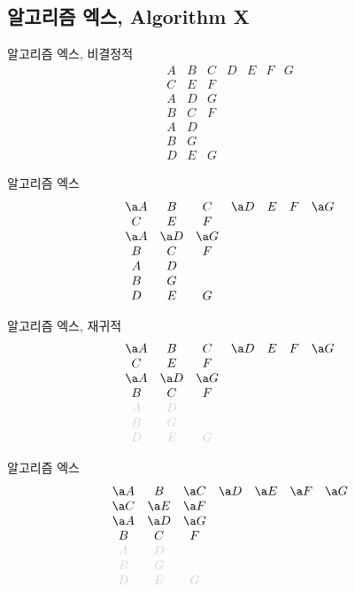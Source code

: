 \documentclass[xcolor=svgnames]{beamer}
\begin{document}
\renewcommand\arraystretch{1.2}

\subsection{알고리즘 엑스, Algorithm X}

\begin{frame}{알고리즘 엑스, 비결정적}
\Large\boldmath
  $$
  \begin{array}{ccccccc}
    A & B & C & D & E & F & G\\
    C & E & F &&&&\\
    A & D & G &&&&\\
    B & C & F &&&&\\
    A & D &&&&&\\
    B & G &&&&&\\
    D & E & G &&&&
  \end{array}
  $$
\end{frame}

%
\begin{frame}{알고리즘 엑스}
\Large\boldmath
  $$
  \begin{array}{ccccccc}
    \a A & B & C & \a D & E & F & \a G\\
    C & E & F &&&&\\
    \a A & \a D & \a G &&&&\\
    B & C & F &&&&\\
    A & D &&&&&\\
    B & G &&&&&\\
    D & E & G &&&&
  \end{array}
  $$
\end{frame}

%
\begin{frame}{알고리즘 엑스, 재귀적}
\Large\boldmath
  $$
  \begin{array}{ccccccc}
    \a A & B & C & \a D & E & F & \a G\\
    C & E & F &&&&\\
    \a A & \a D & \a G &&&&\\
    B & C & F &&&&\\
    \g A & \g D &&&&&\\
    \g B & \g G &&&&&\\
    \g D & \g E & \g G &&&&
  \end{array}
  $$
\end{frame}

%
\begin{frame}{알고리즘 엑스}
\Large\boldmath
  $$
  \begin{array}{ccccccc}
    \a A & B & \a C & \a D & \a E & \a F & \a G\\
    \a C & \a E & \a F &&&&\\
    \a A & \a D & \a G &&&&\\
    B & C & F &&&&\\
    \g A & \g D &&&&&\\
    \g B & \g G &&&&&\\
    \g D & \g E & \g G &&&&
  \end{array}
  $$
\end{frame}
\end{document}
